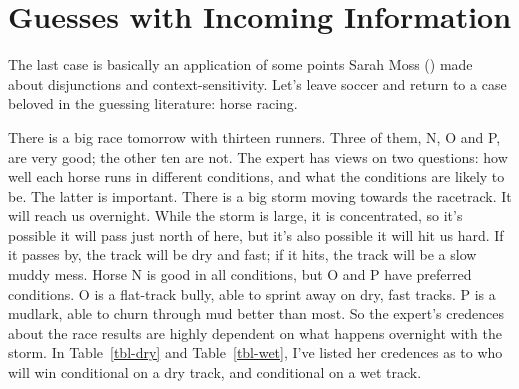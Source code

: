 \documentclass[
  11pt,
  letterpaper,
  DIV=11,
  numbers=noendperiod,
  twoside]{scrartcl}
\begin{document}
\section{Guesses with Incoming Information}\label{sec-incoming}

The last case is basically an application of some points Sarah Moss
() made about disjunctions and
context-sensitivity. Let's leave soccer and return to a case beloved in
the guessing literature: horse racing.

There is a big race tomorrow with thirteen runners. Three of them, N, O
and P, are very good; the other ten are not. The expert has views on two
questions: how well each horse runs in different conditions, and what
the conditions are likely to be. The latter is important. There is a big
storm moving towards the racetrack. It will reach us overnight. While
the storm is large, it is concentrated, so it's possible it will pass
just north of here, but it's also possible it will hit us hard. If it
passes by, the track will be dry and fast; if it hits, the track will be
a slow muddy mess. Horse N is good in all conditions, but O and P have
preferred conditions. O is a flat-track bully, able to sprint away on
dry, fast tracks. P is a mudlark, able to churn through mud better than
most. So the expert's credences about the race results are highly
dependent on what happens overnight with the storm. In
Table~\ref{tbl-dry} and Table~\ref{tbl-wet}, I've listed her credences
as to who will win conditional on a dry track, and conditional on a wet
track.
\end{document}

